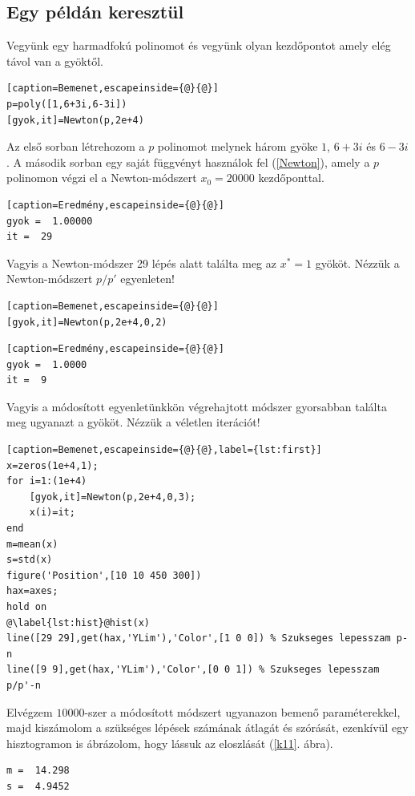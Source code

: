 \documentclass[a4paper,12pt]{report}
\begin{document}
                \subsection{Egy példán keresztül}
				Vegyünk egy harmadfokú polinomot és vegyünk olyan kezdőpontot amely elég távol van a gyöktől.
				\begin{singlespace}
                \begin{lstlisting}[caption=Bemenet,escapeinside={@}{@}]
p=poly([1,6+3i,6-3i])
[gyok,it]=Newton(p,2e+4)
				\end{lstlisting}
                \end{singlespace}
				Az első sorban létrehozom a $p$ polinomot melynek három gyöke $1$, $6+3i$ és $6-3i$. A második sorban egy saját függvényt használok fel (\ref{Newton}), amely a $p$ polinomon végzi el a Newton-módszert $x_0=20000$ kezdőponttal.
				\begin{singlespace}
                \begin{lstlisting}[caption=Eredmény,escapeinside={@}{@}]
gyok =  1.00000
it =  29
				\end{lstlisting}
                \end{singlespace}
				Vagyis a Newton-módszer 29 lépés alatt találta meg az $x^*=1$ gyököt. Nézzük a Newton-módszert $p/p'$ egyenleten!
				\begin{singlespace}
                \begin{lstlisting}[caption=Bemenet,escapeinside={@}{@}]
[gyok,it]=Newton(p,2e+4,0,2)
				\end{lstlisting}
				\begin{lstlisting}[caption=Eredmény,escapeinside={@}{@}]
gyok =  1.0000
it =  9
				\end{lstlisting}
                \end{singlespace}
				Vagyis a módosított egyenletünkkön végrehajtott módszer gyorsabban találta meg ugyanazt a gyököt. Nézzük a véletlen iterációt!
				\begin{singlespace}
                \begin{lstlisting}[caption=Bemenet,escapeinside={@}{@},label={lst:first}]
x=zeros(1e+4,1);
for i=1:(1e+4)
	[gyok,it]=Newton(p,2e+4,0,3);
	x(i)=it;
end
m=mean(x)
s=std(x)
figure('Position',[10 10 450 300])
hax=axes;
hold on
@\label{lst:hist}@hist(x)
line([29 29],get(hax,'YLim'),'Color',[1 0 0]) % Szukseges lepesszam p-n
line([9 9],get(hax,'YLim'),'Color',[0 0 1]) % Szukseges lepesszam p/p'-n
				\end{lstlisting}
                \end{singlespace}
				Elvégzem $10000$-szer a módosított módszert ugyanazon bemenő paraméterekkel, majd kiszámolom a szükséges lépések számának átlagát és szórását, ezenkívül egy hisztogramon is ábrázolom, hogy lássuk az eloszlását (\ref{k11}. ábra).
				\begin{singlespace}
                \begin{lstlisting}[caption=Eredmény]
m =  14.298
s =  4.9452
				\end{lstlisting}
				\end{singlespace}
                
\end{document}
